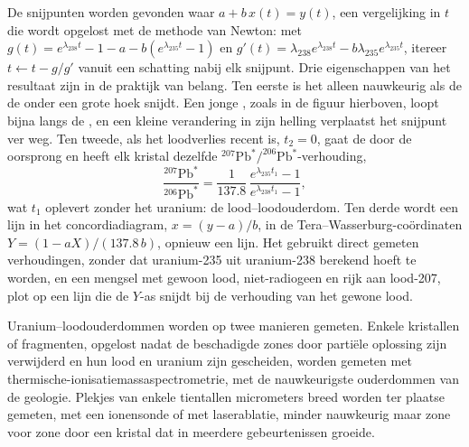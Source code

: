 
De snijpunten worden gevonden waar $a + b\,x(t) = y(t)$, een vergelijking in $t$ die
wordt opgelost met de methode van Newton: met $g(t) = e^{\lambda_{238}t} - 1 - a -
b(e^{\lambda_{235}t} - 1)$ en $g'(t) = \lambda_{238}e^{\lambda_{238}t} -
b\lambda_{235}e^{\lambda_{235}t}$, itereer $t \leftarrow t - g/g'$ vanuit een schatting
nabij elk snijpunt. Drie eigenschappen van het resultaat zijn in de praktijk van belang.
Ten eerste is het  alleen nauwkeurig als de  de
 onder een grote hoek snijdt. Een jonge , zoals in de figuur hierboven, loopt
bijna langs de , en een kleine verandering in zijn helling verplaatst het
snijpunt ver weg. Ten tweede, als het loodverlies recent is, $t_2 = 0$, gaat de 
door de oorsprong en heeft elk kristal dezelfde
$^{207}\mathrm{Pb}^*/^{206}\mathrm{Pb}^*$-verhouding,
\[
\frac{^{207}\mathrm{Pb}^*}{^{206}\mathrm{Pb}^*} = \frac{1}{137.8}\,
\frac{e^{\lambda_{235}t_1} - 1}{e^{\lambda_{238}t_1} - 1},
\]
wat $t_1$ oplevert zonder het uranium: de lood--loodouderdom. Ten derde wordt een lijn in het
concordiadiagram, $x = (y - a)/b$, in de Tera--Wasserburg-coördinaten $Y = (1 - aX)/(137.8\,b)$,
opnieuw een lijn. Het 
gebruikt direct gemeten verhoudingen, zonder dat uranium-235
uit uranium-238 berekend hoeft te worden, en een mengsel met gewoon lood, niet-radiogeen en rijk aan
lood-207, plot op een lijn die de $Y$-as snijdt bij de verhouding van het gewone
lood.

Uranium--loodouderdommen worden op twee manieren gemeten. Enkele kristallen of fragmenten,
opgelost nadat de beschadigde zones door partiële oplossing zijn verwijderd
en hun lood en uranium zijn gescheiden, worden gemeten met
thermische-ionisatiemassaspectrometrie, met de nauwkeurigste ouderdommen van de geologie. Plekjes van enkele tientallen
micrometers breed worden ter plaatse gemeten, met een ionensonde of met laserablatie,
minder nauwkeurig maar zone voor zone door een kristal dat in
meerdere gebeurtenissen groeide.

